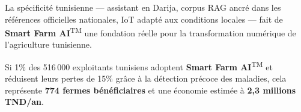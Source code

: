\documentclass[12pt,a4paper,oneside]{report}
\newcommand{\farmAI}{\textbf{Smart Farm AI}\textsuperscript{TM}}
\begin{document}
La spécificité tunisienne — assistant en Darija, corpus RAG ancré dans les références
officielles nationales, IoT adapté aux conditions locales — fait de \farmAI{} une
fondation réelle pour la transformation numérique de l'agriculture tunisienne.

\begin{tcolorbox}[technote,title={Impact attendu}]
Si 1\% des 516\,000 exploitants tunisiens adoptent \farmAI{} et réduisent leurs pertes
de 15\% grâce à la détection précoce des maladies, cela représente
\textbf{774 fermes bénéficiaires} et une économie estimée à \textbf{2,3 millions TND/an}.
\end{tcolorbox}

\end{document}
